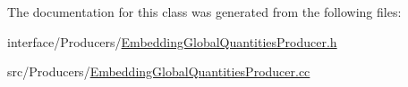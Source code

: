 The documentation for this class was generated from the following files:\begin{DoxyCompactItemize}
\item 
interface/Producers/\hyperlink{EmbeddingGlobalQuantitiesProducer_8h}{EmbeddingGlobalQuantitiesProducer.h}\item 
src/Producers/\hyperlink{EmbeddingGlobalQuantitiesProducer_8cc}{EmbeddingGlobalQuantitiesProducer.cc}\end{DoxyCompactItemize}
